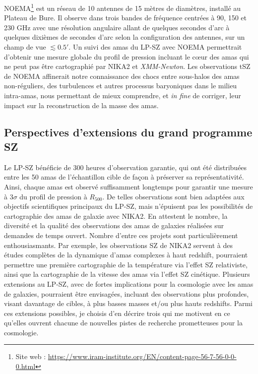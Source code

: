 NOEMA\footnote{Site web :
  \url{https://www.iram-institute.org/EN/content-page-56-7-56-0-0-0.html}}
est un réseau de 10 antennes de 15 mètres de diamètres, installé
au Plateau de Bure. Il observe dans trois bandes
de fréquence centrées à 90, 150 et 230 GHz avec une résolution
angulaire allant de quelques secondes d'arc à quelques dixièmes de
secondes d'arc selon la configuration des antennes, sur un champ de
vue $\lesssim 0.5'$. Un suivi des amas du LP-SZ avec NOEMA permettrait
d'obtenir une mesure globale du profil de pression incluant le c\oe ur
des amas qui ne peut pas être cartographié par NIKA2 et
\emph{XMM-Newton}. Les observations tSZ de NOEMA affinerait notre
connaissance des chocs entre sous-halos des amas non-réguliers, des
turbulences et autres processus baryoniques dans le milieu intra-amas,
nous permettant de mieux comprendre, et \emph{in fine} de corriger,
leur impact sur la reconstruction de la masse des amas.



\subsection{Perspectives d'extensions du grand programme SZ}

Le LP-SZ bénéficie de 300 heures d'observation garantie, qui ont été
distribuées entre les 50 amas de l'échantillon cible de façon à
préserver sa représentativité. Ainsi, chaque amas est observé
suffisamment longtemps pour garantir une mesure à 3$\sigma$ du profil de
pression à $R_{500}$. De telles observations sont bien adaptées aux
objectifs scientifiques principaux du LP-SZ, mais n'épuisent pas les
possibilités de cartographie des amas de galaxie avec NIKA2. En
attestent le nombre, la diversité et la qualité des observations des
amas de galaxies réalisées sur demandes de temps ouvert. Nombre
d'entre ces projets sont particulièrement enthousiasmants. Par
exemple, les observations SZ de NIKA2 servent à des études complètes
de la dynamique d'amas complexes à haut redshift, pourraient permettre
une première cartographie de la température via l'effet SZ
relativiste, ainsi que la cartographie de la vitesse des amas via
l'effet SZ cinétique. Plusieurs extensions au LP-SZ, avec de fortes
implications pour la cosmologie avec les amas de galaxies, pourraient
être envisagées, incluant des observations plus profondes, visant
davantage de cibles, à plus basses masses et/ou plus hauts redshifts. 
Parmi ces extensions possibles, je choisis d'en décrire trois qui me
motivent en ce qu'elles ouvrent chacune de nouvelles pistes de
recherche prometteuses pour la cosmologie.


